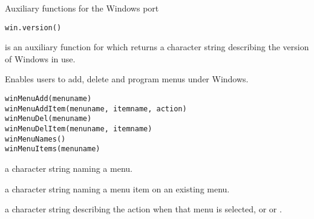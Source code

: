 %
\begin{Description}\relax
Auxiliary functions for the Windows port
\end{Description}
%
\begin{Usage}
\begin{verbatim}
win.version()
\end{verbatim}
\end{Usage}
%
\begin{Details}\relax
{} is an auxiliary function for
 which returns a character string describing
the version of Windows in use.
\end{Details}
%
\begin{Description}\relax
Enables users to add, delete and program menus under Windows.
\end{Description}
%
\begin{Usage}
\begin{verbatim}
winMenuAdd(menuname)
winMenuAddItem(menuname, itemname, action)
winMenuDel(menuname)
winMenuDelItem(menuname, itemname)
winMenuNames()
winMenuItems(menuname)
\end{verbatim}
\end{Usage}
%
\begin{Arguments}
\begin{ldescription}
\item[\code{menuname}] a character string naming a menu.
\item[\code{itemname}] a character string naming a menu item on an existing menu.
\item[\code{action}] a character string describing the action when that menu
is selected, or  or .
\end{ldescription}
\end{Arguments}
%
